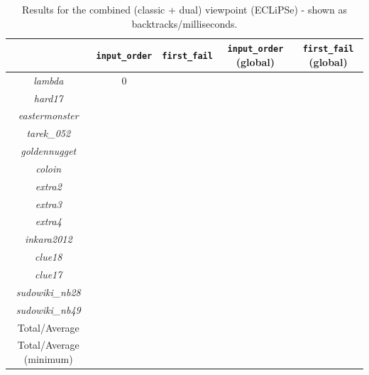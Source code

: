 \begin{table}[H]
\bgroup
\def\arraystretch{1.3}
\begin{tabular}{ccccc}
\multicolumn{1}{l}{}    & \texttt{input\_order} & \texttt{first\_fail} & \texttt{input\_order} (global) & \texttt{first\_fail} (global) \\ \hline
\textit{lambda} & 0 &             &                           &                          \\
\textit{hard17}          &              &             &                           &                          \\
\textit{eastermonster}   &              &             &                           &                          \\
\textit{tarek\_052}      &              &             &                           &                          \\
\textit{goldennugget}    &              &             &                           &                          \\
\textit{coloin}          &              &             &                           &                          \\
\textit{extra2}          &              &             &                           &                          \\
\textit{extra3}          &              &             &                           &                          \\
\textit{extra4}          &              &             &                           &                          \\
\textit{inkara2012}      &              &             &                           &                          \\
\textit{clue18}          &              &             &                           &                          \\
\textit{clue17}          &              &             &                           &                          \\
\textit{sudowiki\_nb28}  &              &             &                           &                          \\
\textit{sudowiki\_nb49}  &              &             &                           &                          \\\hline
Total/Average           &              &             &                           &                          \\
Total/Average (minimum) &              &             &                           &                         
\end{tabular}
\egroup
\caption{Results for the combined (classic + dual) viewpoint (ECLiPSe) - shown as backtracks/milliseconds.}
\label{tab:res3}
\end{table}

